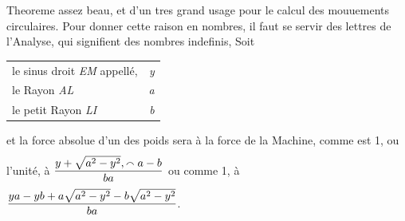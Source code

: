 \pend 
\pstart
{}\-\pend \pstart
Theoreme assez beau, et d'un tres grand usage pour le calcul des mouuements\protect{} circulaires. \pend \pstart
Pour donner cette raison en nombres, il faut se servir des lettres de l'Analyse\protect{}, qui signifient des nombres indefinis, 
\pend 
\count{}
\pstart
Soit
\begin{tabular}[t]{lr}
le sinus droit \textit{EM} appell\'{e},&\textit{y}\hspace{0.1mm}\\
le Rayon \textit{AL}&\textit{a}\\
le petit Rayon \textit{LI}&\textit{b}\\
\end{tabular}
\pend
\vspace{1mm}
\pstart\noindent
et la force absolue\protect{} d'un des poids
sera \`{a} la force de la Machine\protect{},
comme est 1, ou l'unit\'{e}, \`{a} $\rule[-4mm]{0mm}{12mm}\displaystyle\frac{y + \sqrt{a^2 - y^2}, \smallfrown a - b}{ba}$
ou comme 1,
\`{a} $\rule[-4mm]{0mm}{10mm}\displaystyle\frac{ya - yb + a\sqrt{a^2 - y^2} - b\sqrt{a^2 - y^2}}{ba}$. 
\pend